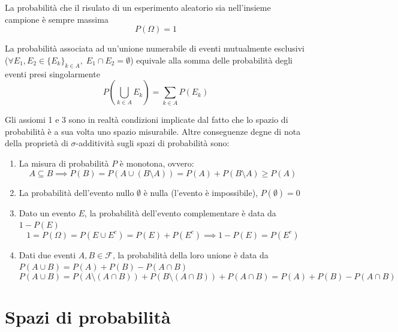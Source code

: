             \begin{axiom}
                La probabilità che il risulato di un esperimento aleatorio sia nell'insieme campione è sempre massima
                \[
                    P(\Omega) = 1
                \]
            \end{axiom}

            \begin{axiom}
                La probabilità associata ad un'unione numerabile di eventi mutualmente esclusivi ($\forall E_{1}, E_{2} \in \{E_{k}\}_{k \in A}, \; E_{1} \cap E_{2} = \emptyset$) equivale alla somma delle probabilità degli eventi presi singolarmente
                \[
                    P\left(\bigcup_{k \in A} E_{k}\right) = \sum_{k \in A} P(E_{k})
                \]
            \end{axiom}

            Gli assiomi 1 e 3 sono in realtà condizioni implicate dal fatto che lo spazio di probabilità è a sua volta uno spazio misurabile.
            Altre conseguenze degne di nota della proprietà di $\sigma$-additività sugli spazi di probabilità sono:
            \begin{enumerate}
                \item La misura di probabilità $P$ è monotona, ovvero:
                \[
                    A \subseteq B \implies P(B) = P(A \cup (B \setminus A)) = P(A) + P(B \setminus A) \geq P(A)
                \]
                \item La probabilità dell'evento nullo $\emptyset$ è nulla (l'evento è impossibile), $P(\emptyset) = 0$
                \item Dato un evento $E$, la probabilità dell'evento complementare è data da $1 - P(E)$
                \[
                    1 = P(\Omega) = P(E \cup E^{c}) = P(E) + P(E^{c}) \implies 1 - P(E) = P(E^{c})
                \]
                \item Dati due eventi $A, B \in \mathcal{F}$, la probabilità della loro unione è data da $P(A \cup B) = P(A) + P(B) - P(A \cap B)$
                \[
                    P(A \cup B) = P(A \setminus (A \cap B)) + P(B \setminus (A \cap B)) + P(A \cap B) = P(A) + P(B) - P(A \cap B)
                \]
            \end{enumerate}



    \section{Spazi di probabilità}
